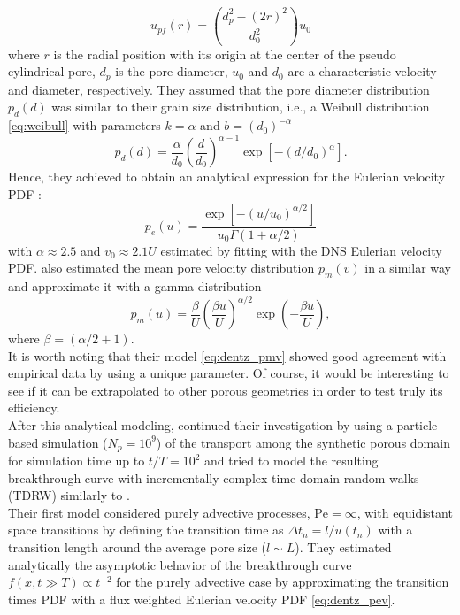 \begin{equation}\label{eq:dentz_poiseuille}
u_{pf}(r)=\left(\frac{d_p^2-(2r)^2}{d_0^2}\right)u_0
\end{equation}
where $r$ is the radial position with its origin at the center of the pseudo cylindrical pore, $d_p$ is the pore diameter, $u_0$ and $d_0$ are a characteristic velocity and diameter, respectively.
They assumed that the pore diameter distribution $p_d(d)$ was similar to their grain size distribution, i.e., a Weibull distribution \eqref{eq:weibull} with parameters $k=\alpha$ and $b=(d_0)^{-\alpha}$
\[
p_d(d)=\frac{\alpha}{d_0}\left(\frac{d}{d_0}\right)^{\alpha-1}\exp[-(d/d_0)^\alpha].
\]
Hence, they achieved to obtain an analytical expression for the Eulerian velocity PDF :
\begin{equation}\label{eq:dentz_pev}
p_e(u)=\frac{\exp[-(u/u_0)^{\alpha/2}]}{u_0\Gamma(1+\alpha/2)}
\end{equation}
with $\alpha\approx2.5$ and $v_0\approx2.1U$ estimated by fitting with the DNS Eulerian velocity PDF.
\citeauthor{Dentz2017} also estimated the mean pore velocity distribution $p_m(v)$ in a similar way and approximate it with a gamma distribution
\begin{equation}\label{eq:dentz_pmv}
p_m(u)=\frac{\beta}{U}\left(\frac{\beta u}{U}\right)^{\alpha/2}\exp\left(-\frac{\beta u}{U}\right),
\end{equation}
where $\beta=(\alpha/2+1)$.\\
It is worth noting that their model \eqref{eq:dentz_pmv} showed good agreement with empirical data by using a unique parameter. Of course, it would be interesting to see if it can be extrapolated to other porous geometries in order to test truly its efficiency.\\
After this analytical modeling, \citeauthor{Dentz2017} continued their investigation by using a particle based simulation ($N_p=10^9$) of the transport among the synthetic porous domain for simulation time up to $t/T=10^2$ and tried to model the resulting breakthrough curve with incrementally complex time domain random walks (TDRW) similarly to \citeauthor{Puyguiraud2019}.\\
Their first model considered purely advective processes, $\mathrm{Pe}=\infty$, with equidistant space transitions by defining the transition time as $\Delta t_n=l/u(t_n)$ with a transition length around the average pore size ($l\sim L$). 
They estimated analytically the asymptotic behavior of the breakthrough curve $f(x,t\gg T)\propto t^{-2}$ for the purely advective case by approximating the transition times PDF with a flux weighted Eulerian velocity PDF \eqref{eq:dentz_pev}.\\
